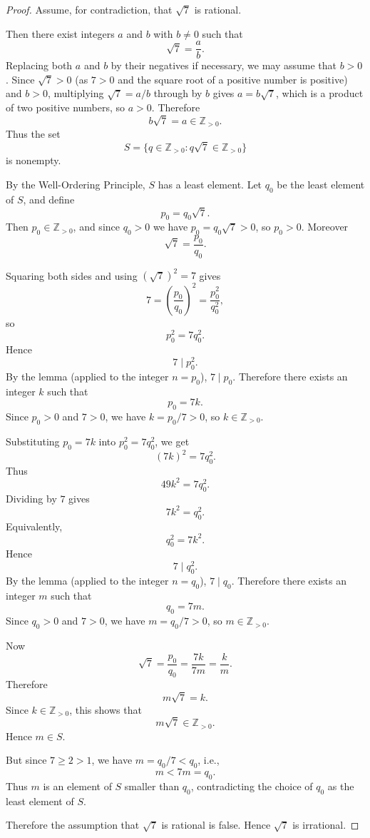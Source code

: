 \begin{proof}
Assume, for contradiction, that $\sqrt{7}$ is rational.

Then there exist integers $a$ and $b$ with $b\neq 0$ such that
\[
\sqrt{7}=\frac{a}{b}.
\]
Replacing both $a$ and $b$ by their negatives if necessary, we may assume that $b>0$. Since $\sqrt{7}>0$ (as $7>0$ and the square root of a positive number is positive) and $b>0$, multiplying $\sqrt{7}=a/b$ through by $b$ gives $a = b\sqrt{7}$, which is a product of two positive numbers, so $a>0$. Therefore
\[
b\sqrt{7}=a\in \mathbb{Z}_{>0}.
\]
Thus the set
\[
S=\{q\in \mathbb{Z}_{>0}: q\sqrt{7}\in \mathbb{Z}_{>0}\}
\]
is nonempty.

By the Well-Ordering Principle, $S$ has a least element. Let $q_0$ be the least element of $S$, and define
\[
p_0=q_0\sqrt{7}.
\]
Then $p_0\in \mathbb{Z}_{>0}$, and since $q_0>0$ we have $p_0=q_0\sqrt{7}>0$, so $p_0>0$. Moreover
\[
\sqrt{7}=\frac{p_0}{q_0}.
\]

Squaring both sides and using $(\sqrt{7})^2=7$ gives
\[
7 = \left(\frac{p_0}{q_0}\right)^2 = \frac{p_0^2}{q_0^2},
\]
so
\[
p_0^2=7q_0^2.
\]
Hence
\[
7\mid p_0^2.
\]
By the lemma (applied to the integer $n=p_0$), $7\mid p_0$. Therefore there exists an integer $k$ such that
\[
p_0=7k.
\]
Since $p_0>0$ and $7>0$, we have $k=p_0/7>0$, so $k\in \mathbb{Z}_{>0}$.

Substituting $p_0=7k$ into $p_0^2=7q_0^2$, we get
\[
(7k)^2=7q_0^2.
\]
Thus
\[
49k^2=7q_0^2.
\]
Dividing by $7$ gives
\[
7k^2=q_0^2.
\]
Equivalently,
\[
q_0^2=7k^2.
\]
Hence
\[
7\mid q_0^2.
\]
By the lemma (applied to the integer $n=q_0$), $7\mid q_0$. Therefore there exists an integer $m$ such that
\[
q_0=7m.
\]
Since $q_0>0$ and $7>0$, we have $m=q_0/7>0$, so $m\in \mathbb{Z}_{>0}$.

Now
\[
\sqrt{7}=\frac{p_0}{q_0}
=\frac{7k}{7m}
=\frac{k}{m}.
\]
Therefore
\[
m\sqrt{7}=k.
\]
Since $k\in \mathbb{Z}_{>0}$, this shows that
\[
m\sqrt{7}\in \mathbb{Z}_{>0}.
\]
Hence $m\in S$.

But since $7\geq 2>1$, we have $m=q_0/7<q_0$, i.e.,
\[
m<7m=q_0.
\]
Thus $m$ is an element of $S$ smaller than $q_0$, contradicting the choice of $q_0$ as the least element of $S$.

Therefore the assumption that $\sqrt{7}$ is rational is false. Hence $\sqrt{7}$ is irrational.
\end{proof}
